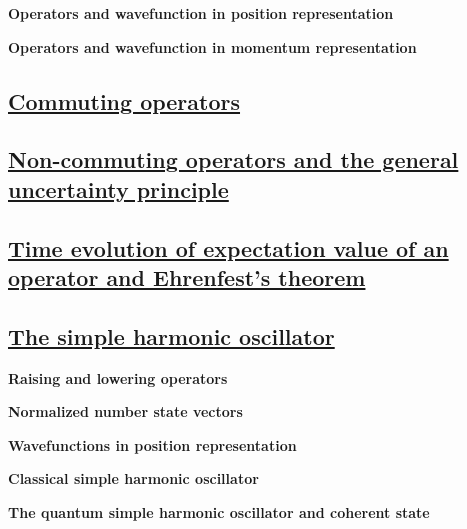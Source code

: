 \textbf{Operators and wavefunction in position representation}

\textbf{Operators and wavefunction in momentum representation}

\subsection{\underline{Commuting operators}}


\subsection{\underline{Non-commuting operators and the general uncertainty principle}}

\subsection{\underline{Time evolution of expectation value of an operator and Ehrenfest's theorem}}

\subsection{\underline{The simple harmonic oscillator}}

\textbf{Raising and lowering operators}

\textbf{Normalized number state vectors}

\textbf{Wavefunctions in position representation}

\textbf{Classical simple harmonic oscillator}

\textbf{The quantum simple harmonic oscillator and coherent state}






